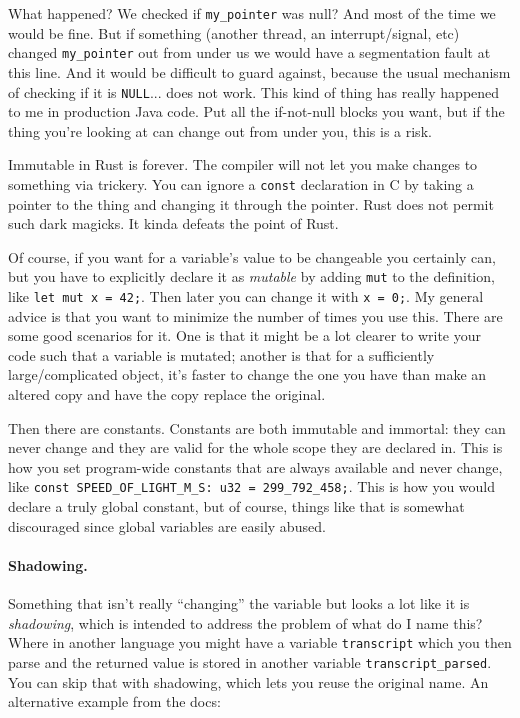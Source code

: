 What happened? We checked if \texttt{my\_pointer} was null? And most of the time we would be fine. But if something (another thread, an interrupt/signal, etc) changed \texttt{my\_pointer} out from under us we would have a segmentation fault at this line. And it would be difficult to guard against, because the usual mechanism of checking if it is \texttt{NULL}... does not work. This kind of thing has really happened to me in production Java code. Put all the if-not-null blocks you want, but if the thing you're looking at can change out from under you, this is a risk.

Immutable in Rust is forever. The compiler will not let you make changes to something via trickery. You can ignore a \texttt{const} declaration in C by taking a pointer to the thing and changing it through the pointer. Rust does not permit such dark magicks. It kinda defeats the point of Rust.

Of course, if you want for a variable's value to be changeable you certainly can, but you have to explicitly declare it as \textit{mutable} by adding \texttt{mut} to the definition, like \texttt{let mut x = 42;}. Then later you can change it with \texttt{x = 0;}. My general advice is that you want to minimize the number of times you use this. There are some good scenarios for it. One is that it might be a lot clearer to write your code such that a variable is mutated; another is that for a sufficiently large/complicated object, it's faster to change the one you have than make an altered copy and have the copy replace the original.

Then there are constants. Constants are both immutable and immortal: they can never change and they are valid for the whole scope they are declared in. This is how you set program-wide constants that are always available and never change, like \texttt{const SPEED\_OF\_LIGHT\_M\_S: u32 = 299\_792\_458;}. This is how you would declare a truly global constant, but of course, things like that is somewhat discouraged since global variables are easily abused.

\paragraph{Shadowing.}
Something that isn't really ``changing'' the variable but looks a lot like it is \textit{shadowing}, which is intended to address the problem of what do I name this? Where in another language you might have a variable \texttt{transcript} which you then parse and the returned value is stored in another variable \texttt{transcript\_parsed}. You can skip that with shadowing, which lets you reuse the original name. An alternative example from the docs:

